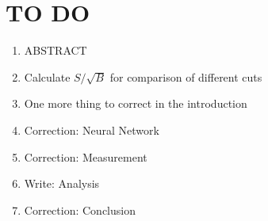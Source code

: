 \chapter{TO DO}
\begin{enumerate}
    \item ABSTRACT
    \item Calculate $S/\sqrt{B}$ for comparison of different cuts
    \item One more thing to correct in the introduction
    \item Correction: Neural Network 
    \item Correction: Measurement
    \item Write: Analysis
    \item Correction: Conclusion
\end{enumerate}
